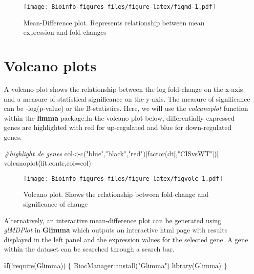 \documentclass[
  openany]{book}
\newenvironment{Shaded}{\begin{snugshade}}{\end{snugshade}}
\newcommand{\AttributeTok}[1]{\textcolor[rgb]{0.77,0.63,0.00}{#1}}
\newcommand{\CommentTok}[1]{\textcolor[rgb]{0.56,0.35,0.01}{\textit{#1}}}
\newcommand{\ControlFlowTok}[1]{\textcolor[rgb]{0.13,0.29,0.53}{\textbf{#1}}}
\newcommand{\FunctionTok}[1]{\textcolor[rgb]{0.00,0.00,0.00}{#1}}
\newcommand{\NormalTok}[1]{#1}
\newcommand{\OtherTok}[1]{\textcolor[rgb]{0.56,0.35,0.01}{#1}}
\newcommand{\SpecialCharTok}[1]{\textcolor[rgb]{0.00,0.00,0.00}{#1}}
\newcommand{\StringTok}[1]{\textcolor[rgb]{0.31,0.60,0.02}{#1}}
\begin{document}
\begin{figure}
\centering
\texttt{[image: Bioinfo-figures\_files/figure-latex/figmd-1.pdf]}
\caption{\label{fig:figmd}Mean-Difference plot. Represents relationship between mean expression and fold-changes}
\end{figure}

\hypertarget{volcano-plots}{%
\section{Volcano plots}\label{volcano-plots}}

A volcano plot shows the relationship between the log fold-change on the x-axis and a measure of statistical significance on the y-axis. The measure of significance can be -log(p-value) or the B-statistics. Here, we will use the \emph{volcanoplot} function within the \textbf{limma} package.In the volcano plot below, differentially expressed genes are highlighted with red for up-regulated and blue for down-regulated genes.

\begin{Shaded}
\begin{Highlighting}[]
\CommentTok{\#highlight de genes}
\NormalTok{col}\OtherTok{\textless{}{-}}\FunctionTok{c}\NormalTok{(}\StringTok{"blue"}\NormalTok{,}\StringTok{"black"}\NormalTok{,}\StringTok{"red"}\NormalTok{)[}\FunctionTok{factor}\NormalTok{(dt[,}\StringTok{"CISvsWT"}\NormalTok{])]}
\FunctionTok{volcanoplot}\NormalTok{(fit.contr,}\AttributeTok{col=}\NormalTok{col)}
\end{Highlighting}
\end{Shaded}

\begin{figure}
\centering
\texttt{[image: Bioinfo-figures\_files/figure-latex/figvolc-1.pdf]}
\caption{\label{fig:figvolc}Volcano plot. Shows the relationship between fold-change and significance of change}
\end{figure}

Alternatively, an interactive mean-difference plot can be generated using \emph{glMDPlot} in \textbf{Glimma} which outputs an interactive html page with results displayed in the left panel and the expression values for the selected gene. A gene within the dataset can be searched through a search bar.

\begin{Shaded}
\begin{Highlighting}[]
\ControlFlowTok{if}\NormalTok{(}\SpecialCharTok{!}\FunctionTok{require}\NormalTok{(Glimma))}
\NormalTok{\{}
\NormalTok{  BiocManager}\SpecialCharTok{::}\FunctionTok{install}\NormalTok{(}\StringTok{"Glimma"}\NormalTok{)}
  \FunctionTok{library}\NormalTok{(Glimma)}
\NormalTok{\}}
\end{Highlighting}
\end{Shaded}
\end{document}
